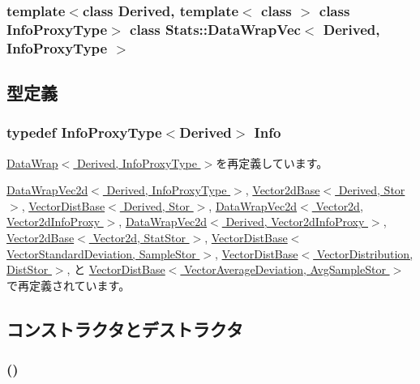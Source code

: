 \subsubsection*{template$<$class Derived, template$<$ class $>$ class InfoProxyType$>$ class Stats::DataWrapVec$<$ Derived, InfoProxyType $>$}



\subsection{型定義}
\hypertarget{classStats_1_1DataWrapVec_a76d2c248839f34168d2a3760bc1fbdb9}{
\subsubsection[{Info}]{\setlength{\rightskip}{0pt plus 5cm}typedef InfoProxyType$<$Derived$>$ {\bf Info}}}
\label{classStats_1_1DataWrapVec_a76d2c248839f34168d2a3760bc1fbdb9}


\hyperlink{classStats_1_1DataWrap_a76d2c248839f34168d2a3760bc1fbdb9}{DataWrap$<$ Derived, InfoProxyType $>$}を再定義しています。

\hyperlink{classStats_1_1DataWrapVec2d_a76d2c248839f34168d2a3760bc1fbdb9}{DataWrapVec2d$<$ Derived, InfoProxyType $>$}, \hyperlink{classStats_1_1Vector2dBase_a54a1e5a7adf65227680acc9effe631ac}{Vector2dBase$<$ Derived, Stor $>$}, \hyperlink{classStats_1_1VectorDistBase_a15ec5f8f1a2c998c2496fad068947481}{VectorDistBase$<$ Derived, Stor $>$}, \hyperlink{classStats_1_1DataWrapVec2d_a76d2c248839f34168d2a3760bc1fbdb9}{DataWrapVec2d$<$ Vector2d, Vector2dInfoProxy $>$}, \hyperlink{classStats_1_1DataWrapVec2d_a76d2c248839f34168d2a3760bc1fbdb9}{DataWrapVec2d$<$ Derived, Vector2dInfoProxy $>$}, \hyperlink{classStats_1_1Vector2dBase_a54a1e5a7adf65227680acc9effe631ac}{Vector2dBase$<$ Vector2d, StatStor $>$}, \hyperlink{classStats_1_1VectorDistBase_a15ec5f8f1a2c998c2496fad068947481}{VectorDistBase$<$ VectorStandardDeviation, SampleStor $>$}, \hyperlink{classStats_1_1VectorDistBase_a15ec5f8f1a2c998c2496fad068947481}{VectorDistBase$<$ VectorDistribution, DistStor $>$}, と \hyperlink{classStats_1_1VectorDistBase_a15ec5f8f1a2c998c2496fad068947481}{VectorDistBase$<$ VectorAverageDeviation, AvgSampleStor $>$}で再定義されています。

\subsection{コンストラクタとデストラクタ}
\hypertarget{classStats_1_1DataWrapVec_a3621fa2bcd19b6b7fe5000c990e10706}{
\subsubsection[{DataWrapVec}]{ ()}}
\label{classStats_1_1DataWrapVec_a3621fa2bcd19b6b7fe5000c990e10706}



